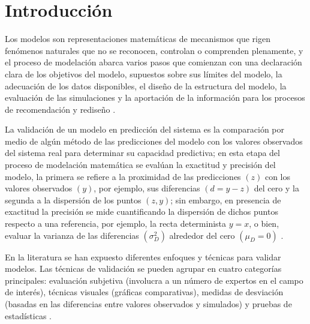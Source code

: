\section{Introducción}
Los modelos son representaciones matemáticas de mecanismos que rigen fenómenos naturales que no se reconocen, controlan o comprenden plenamente, y el proceso de modelación abarca varios pasos que comienzan con una declaración clara de los objetivos del modelo, supuestos sobre sus límites del modelo, la adecuación de los datos disponibles, el diseño de la estructura del modelo, la evaluación de las simulaciones y la aportación de la información para los procesos de recomendación y rediseño \parencite{tedeschi-2006}.
\vspace{.5cm}

La validación de un modelo en predicción del sistema es la comparación por medio de algún método de las predicciones del modelo con los valores observados del sistema real para determinar su capacidad predictiva; en esta etapa del proceso de modelación matemática se evalúan la exactitud y precisión del modelo, la primera se refiere a la proximidad de las predicciones $( z )$ con los valores observados $( y )$, por ejemplo, sus diferencias $ ( d=y-z ) $ del cero y la segunda a la dispersión de los puntos $ (z, y) $; sin embargo, en presencia de exactitud la precisión se mide cuantificando la dispersión de dichos puntos respecto a una referencia, por ejemplo, la recta determinista $ y=x $, o bien, evaluar la varianza de las diferencias $ (\sigma_{D}^{2}) $ alrededor del cero $ (\mu_{D}=0) $ \parencite{medina-peralta-2017}.
\vspace{.5cm}
 
En la literatura se han expuesto diferentes enfoques y técnicas para validar modelos. Las técnicas de validación se pueden agrupar en cuatro categorías principales: evaluación subjetiva (involucra a un número de expertos en el campo de interés), técnicas visuales (gráficas comparativas), medidas de desviación (basadas en las diferencias entre valores observados y simulados) y pruebas de estadísticas \parencite{mayer-butler-1993}.
\vspace{.5cm}
 
